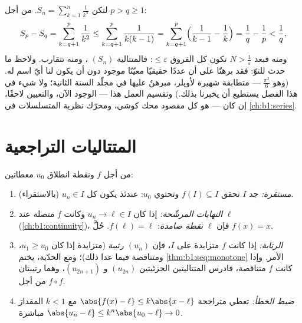 \begin{example}\label{ex:b1:seq:basel}
لتكن $S_n = \sum_{k=1}^{n} \frac{1}{k^2}$. من أجل $p > q \geq 1$:
\[
S_p - S_q = \sum_{k=q+1}^{p} \frac{1}{k^2}
\leq \sum_{k=q+1}^{p} \frac{1}{k(k-1)}
= \sum_{k=q+1}^{p} \Bigl(\frac{1}{k-1} - \frac 1k\Bigr)
= \frac 1q - \frac 1p < \frac 1q ,
\]
ومنه فبعد $N > \frac1\varepsilon$ تكون كل الفروق $\leq \varepsilon$:
فالمتتالية $(S_n)$ ، ومنه تتقارب. ولاحظ ما حدث للتوّ: فقد
برهنّا على أن عددًا حقيقيًا معيّنًا موجود دون أن يكون لنا أيّ اسم
له. (وهو $\frac{\pi^2}{6}$ --- متطابقة شهيرة لأويلر،
مبرهنٌ عليها في مجلّد السنة الثانية؛ ولا شيء في هذا الفصل يستطيع
أن يخبرنا بذلك.) وتقسيم العمل هذا --- الوجود الآن،
والتعيين لاحقًا، إن كان --- هو كل مقصود محك كوشي،
ومحرّك نظرية المتسلسلات في
\cref{ch:b1:series}.
\end{example}

\section{المتتاليات التراجعية}

\begin{method}[دراسة $u_{n+1} = f(u_n)$]\label{met:b1:seq:recurrent}
من أجل $f$ ونقطة انطلاق $u_0$ معطاتين:
\begin{enumerate}
  \item \emph{ مستقرة:} جد  $I$ تحقق $f(I)
        \subseteq I$ وتحتوي $u_0$: عندئذ يكون كل $u_n \in I$ (بالاستقراء).
  \item \emph{النهايات المرشّحة:} إذا كان $u_n \to \ell \in I$ وكانت $f$
        متصلة عند $\ell$ (\cref{ch:b1:continuity})، فإن $\ell$
        \emph{نقطة صامدة}: $f(\ell) = \ell$. حُلَّ $f(x) = x$.
  \item \emph{الرتابة:} إذا كانت $f$ متزايدة على $I$، فإن
        $(u_n)$ رتيبة (متزايدة إذا كان $u_1 \geq u_0$،
        ومتناقصة فيما عدا ذلك)؛ ومع الحدّية،
        يختم \cref{thm:b1:seq:monotone} الأمر. وإذا كانت $f$ متناقصة،
        فادرس المتتاليتين الجزئيتين $(u_{2n})$ و $(u_{2n+1})$،
        وهما رتيبتان من أجل $f \circ f$.
  \item \emph{ضبط الخطأ:} تعطي متراجحة $\abs{f(x) - \ell} \leq
        k\abs{x - \ell}$ مع $k < 1$ المقدارَ $\abs{u_n - \ell} \leq
        k^n \abs{u_0 - \ell} \to 0$ مباشرة.
\end{enumerate}
\end{method}

